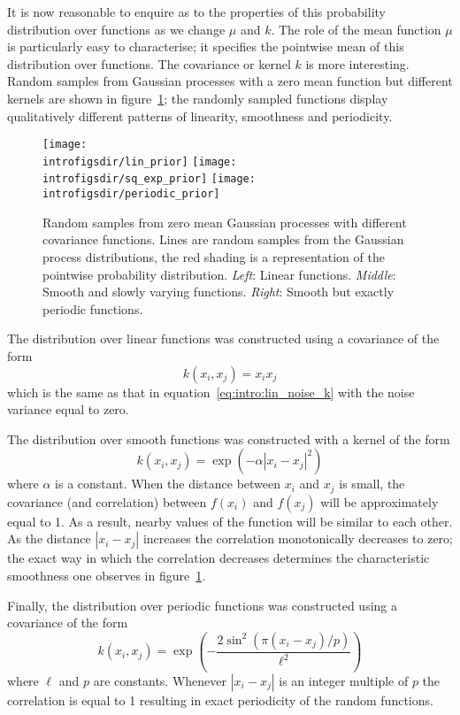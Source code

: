It is now reasonable to enquire as to the properties of this probability distribution over functions as we change $\mu$ and $k$.
The role of the mean function $\mu$ is particularly easy to characterise; it specifies the pointwise mean of this distribution over functions.
The covariance or kernel $k$ is more interesting.
Random samples from Gaussian processes with a zero mean function but different kernels are shown in figure~\ref{fig:intro:samples}; the randomly sampled functions display qualitatively different patterns of linearity, smoothness and periodicity.

\begin{figure}[ht]
\centering
\texttt{[image: \\introfigsdir/lin\_prior]}
\texttt{[image: \\introfigsdir/sq\_exp\_prior]}
\texttt{[image: \\introfigsdir/periodic\_prior]}
\caption[Samples from Gaussian processes with different covariance functions.]{
Random samples from zero mean Gaussian processes with different covariance functions.
Lines are random samples from the Gaussian process distributions, the red shading is a representation of the pointwise probability distribution.
\textit{Left}: Linear functions.
\textit{Middle}: Smooth and slowly varying functions.
\textit{Right}: Smooth but exactly periodic functions.
}
\label{fig:intro:samples}
\end{figure}

The distribution over linear functions was constructed using a covariance of the form
\[
  k(x_i, x_j) = x_i x_j
\]
which is the same as that in equation~\eqref{eq:intro:lin_noise_k} with the noise variance equal to zero.

The distribution over smooth functions was constructed with a kernel of the form
\[
  k(x_i, x_j) = \exp(-\alpha|x_i - x_j|^2)
\]
where $\alpha$ is a constant.
When the distance between $x_i$ and $x_j$ is small, the covariance (and correlation) between $f(x_i)$ and $f(x_j)$ will be approximately equal to 1.
As a result, nearby values of the function will be similar to each other.
As the distance $|x_i - x_j|$ increases the correlation monotonically decreases to zero; the exact way in which the correlation decreases determines the characteristic smoothness one observes in figure~\ref{fig:intro:samples}.

Finally, the distribution over periodic functions was constructed using a covariance of the form
\[
  k(x_i, x_j) = \exp\left(-\frac{2\sin^2 (\pi(x_i - x_j)/p)}{\ell^2}\right)
\]
where $\ell$ and $p$ are constants.
Whenever $|x_i - x_j|$ is an integer multiple of $p$ the correlation is equal to 1 resulting in exact periodicity of the random functions.

